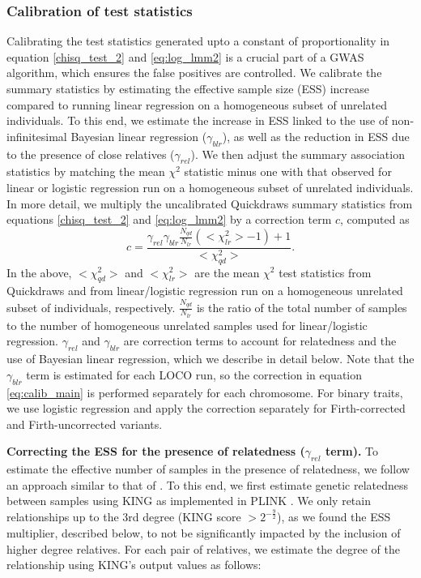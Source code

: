 \subsubsection{Calibration of test statistics}

Calibrating the test statistics generated upto a constant of proportionality in equation \ref{chisq_test_2} and \ref{eq:log_lmm2} is a crucial part of a GWAS algorithm, which ensures the false positives are controlled.
%
We calibrate the summary statistics by estimating the effective sample size (ESS) increase compared to running linear regression on a homogeneous subset of unrelated individuals.
%
To this end, we estimate the increase in ESS linked to the use of non-infinitesimal Bayesian linear regression ($\gamma_{blr}$), as well as the reduction in ESS due to the presence of close relatives ($\gamma_{rel}$).
%
We then adjust the summary association statistics by matching the mean $\chi^2$ statistic minus one \cite{yang2011genomic} with that observed for linear or logistic regression run on a homogeneous subset of unrelated individuals.
%
In more detail, we multiply the uncalibrated Quickdraws summary statistics from equations \ref{chisq_test_2} and \ref{eq:log_lmm2} by a correction term $c$, computed as
\begin{equation}
c = \frac{\gamma_{rel}\gamma_{blr}\frac{N_{qd}}{N_{lr}}(<\chi_{lr}^2> - 1) + 1}{<\chi_{qd}^2>}.
\label{eq:calib_main}
\end{equation}
In the above, $<\chi_{qd}^2>$ and $<\chi_{lr}^2>$ are the mean $\chi^2$ test statistics from Quickdraws and from linear/logistic regression run on a homogeneous unrelated subset of individuals, respectively.
%
$\frac{N_{qd}}{N_{lr}}$ is the ratio of the total number of samples to the number of homogeneous unrelated samples used for linear/logistic regression.
%
$\gamma_{rel}$ and $\gamma_{blr}$ are correction terms to account for relatedness and the use of Bayesian linear regression, which we describe in detail below.
%
Note that the $\gamma_{blr}$ term is estimated for each LOCO run, so the correction in equation \ref{eq:calib_main} is performed separately for each chromosome.
%
For binary traits, we use logistic regression and apply the correction separately for Firth-corrected and Firth-uncorrected variants.

\vspace{2mm}

%
\noindent \textbf{Correcting the ESS for the presence of relatedness ($\gamma_{rel}$ term).} To estimate the effective number of samples in the presence of relatedness, we follow an approach similar to that of \cite{ziyatdinov2021estimating}.
%
To this end, we first estimate genetic relatedness between samples using KING \cite{manichaikul2010robust} as implemented in PLINK \cite{chang2015second}.
%
We only retain relationships up to the 3rd degree (KING score $>2^{-\frac{9}{2}}$), as we found the ESS multiplier, described below, to not be significantly impacted by the inclusion of higher degree relatives.
%
For each pair of relatives, we estimate the degree of the relationship using KING’s output values as follows:

